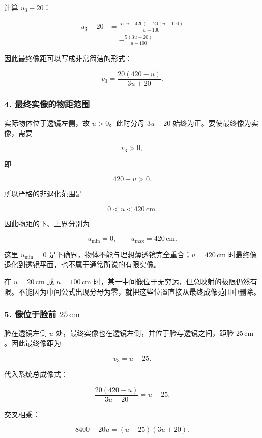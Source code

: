 \documentclass[12pt,a4paper,UTF8]{ctexart}
\begin{document}
计算 \(u_3-20\)：

\[
\begin{aligned}
u_3-20
&=\frac{5(u-420)-20(u-100)}{u-100}\\
&=-\frac{5(3u+20)}{u-100}.
\end{aligned}
\]

因此最终像距可以写成非常简洁的形式：

\[
\boxed{
v_3=\frac{20(420-u)}{3u+20}
}.
\]

\subsubsection{4.
最终实像的物距范围}\label{ux6700ux7ec8ux5b9eux50cfux7684ux7269ux8dddux8303ux56f4}

实际物体位于透镜左侧，故 \(u>0\)。此时分母 \(3u+20\)
始终为正。要使最终像为实像，需要

\[
v_3>0,
\]

即

\[
420-u>0.
\]

所以严格的非退化范围是

\[
\boxed{0<u<420\,\mathrm{cm}}.
\]

因此物距的下、上界分别为

\[
\boxed{u_{\min}=0},
\qquad
\boxed{u_{\max}=420\,\mathrm{cm}}.
\]

这里 \(u_{\min}=0\)
是下确界，物体不能与理想薄透镜完全重合；\(u=420\,\mathrm{cm}\)
时最终像退化到透镜平面，也不属于通常所说的有限实像。

在 \(u=20\,\mathrm{cm}\) 或 \(u=100\,\mathrm{cm}\)
时，某一中间像位于无穷远，但总映射的极限仍然有限。不能因为中间公式出现分母为零，就把这些位置直接从最终成像范围中删除。

\subsubsection{\texorpdfstring{5. 像位于脸前
\(25\,\mathrm{cm}\)}{5. 像位于脸前 25\textbackslash,\textbackslash mathrm\{cm\}}}\label{ux50cfux4f4dux4e8eux8138ux524d-25mathrmcm}

脸在透镜左侧 \(u\) 处，最终实像也在透镜左侧，并位于脸与透镜之间，距脸
\(25\,\mathrm{cm}\)。因此最终像距为

\[
v_3=u-25.
\]

代入系统总成像式：

\[
\frac{20(420-u)}{3u+20}=u-25.
\]

交叉相乘：

\[
8400-20u=(u-25)(3u+20).
\]
\end{document}

